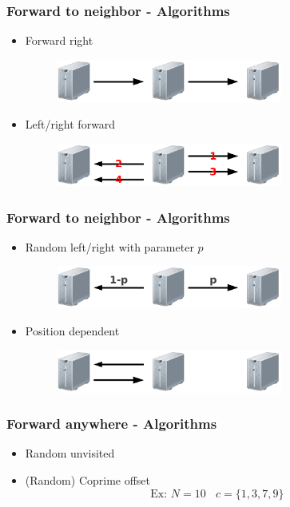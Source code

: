 \documentclass[compress]{beamer}
\begin{document}
\begin{frame}
\frametitle{Forward to neighbor - Algorithms}
\begin{itemize}
 \item Forward right \begin{figure}[h!tb]
 \includegraphics[width=0.7\textwidth]{../resources/p_forwardright.pdf}
 \end{figure}
 \item Left/right forward \begin{figure}[h!tb]
 \includegraphics[width=0.7\textwidth]{../resources/p_forwardleftright.pdf}
 \end{figure}
\end{itemize}
\end{frame}

\begin{frame}
\frametitle{Forward to neighbor - Algorithms}
\begin{itemize}
 \item Random left/right with parameter $p$ \begin{figure}[h!tb]
 \includegraphics[width=0.7\textwidth]{../resources/p_randforward.pdf}
 \end{figure}
 \item Position dependent \begin{figure}[h!tb]
 \includegraphics[width=0.7\textwidth]{../resources/p_position.pdf}
 \end{figure}
\end{itemize}
\end{frame}

\begin{frame}
\frametitle{Forward anywhere - Algorithms}
\begin{itemize}
 \item Random unvisited
 \item (Random) Coprime offset \[\text{Ex: } N=10 ~~~~ c=\{1,3,7,9\}\]
\end{itemize}
\end{frame}
\end{document}
